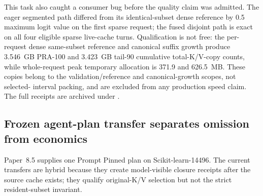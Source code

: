 \documentclass[11pt]{article}
\begin{document}
This task also caught a consumer bug before the quality claim was admitted.
The eager segmented path differed from its identical-subset dense reference by
0.5 maximum logit value on the first sparse request; the fused disjoint path is
exact on all four eligible sparse live-cache turns.  Qualification is not free:
the per-request dense same-subset reference and canonical suffix growth produce
3.546~GB PRA-100 and 3.423~GB tail-90 cumulative total-K/V-copy counts, while
whole-request peak temporary allocation is 371.9 and 626.5~MB.  These copies
belong to the validation/reference and canonical-growth scopes, not selected-
interval packing, and are excluded from any production speed claim.  The full
receipts are archived under
.

\subsection{Frozen agent-plan transfer separates omission from economics}

Paper~8.5 supplies one Prompt Pinned plan on Scikit-learn-14496.  The current
transfers are hybrid because they create model-visible closure receipts after
the source cache exists; they qualify original-K/V selection but not the strict
resident-subset invariant.

\begin{table}[H]
\centering
\small
{}
\caption{Frozen-plan workload economics.  F/R denotes matched Full/reduced
calls.  Positive paired workload is saving; negative is regression.  Receipt
rows are hybrid transformed context and are not pooled with strict resident-
subset execution.}
\label{tab:editorial-agent-transfer}
\end{table}
\end{document}
